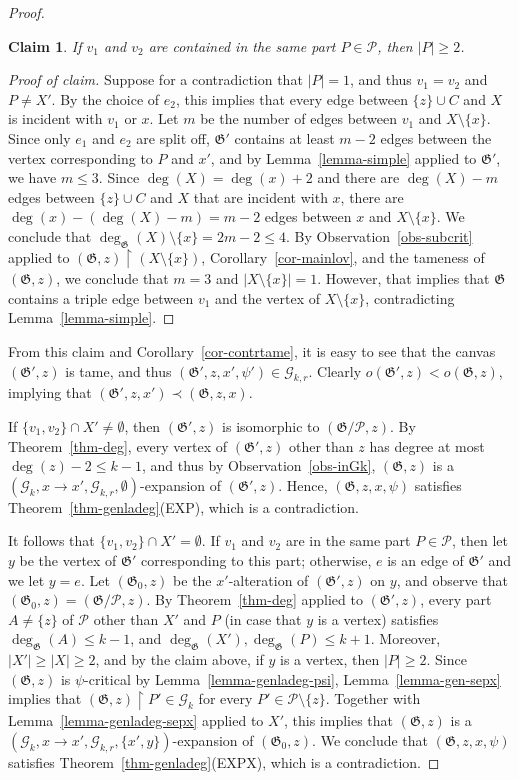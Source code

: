 \documentclass{article}
\newcommand{\PP}{\mathcal{P}}
\newcommand{\GG}{\mathcal{G}}
\newcommand\g{\mathfrak{G}}
\newtheorem*{claim*}{Claim}
\newenvironment{subproof}{%
  \renewcommand{\qedsymbol}{$\blacksquare$}%
  \begin{proof}[Proof of claim]%
}{%
  \end{proof}%
}
\begin{document}
\begin{proof}
\begin{claim*}
If $v_1$ and $v_2$ are contained in the same part $P\in \PP$, then $|P|\ge 2$.  
\end{claim*}
\begin{subproof}
Suppose for a contradiction that $|P|=1$, and thus $v_1=v_2$ and $P\neq X'$.
By the choice of $e_2$, this implies that every edge between $\{z\}\cup C$ and $X$ is incident with $v_1$ or $x$.
Let $m$ be the number of edges between $v_1$ and $X\setminus \{x\}$.
Since only $e_1$ and $e_2$ are split off, $\g'$ contains at least $m-2$ edges between the vertex corresponding to $P$ and $x'$, and by Lemma~\ref{lemma-simple} applied to $\g'$,
we have $m\le 3$.  Since $\deg(X)=\deg(x)+2$ and there are $\deg(X)-m$ edges between $\{z\}\cup C$ and $X$ that are incident with $x$,
there are $\deg(x)-(\deg(X)-m)=m-2$ edges between $x$ and $X\setminus\{x\}$.   We conclude that
$\deg_{\g}(X)\setminus\{x\} = 2m-2\le 4$.  By Observation~\ref{obs-subcrit} applied to $(\g,z)\restriction (X\setminus\{x\})$,
Corollary~\ref{cor-mainlov}, and the tameness of $(\g,z)$, we conclude that $m=3$ and $|X\setminus \{x\}|=1$.
However, that implies that $\g$ contains a triple edge between $v_1$ and the vertex of $X\setminus\{x\}$,
contradicting Lemma~\ref{lemma-simple}.
\end{subproof}

From this claim and Corollary~\ref{cor-contrtame}, it is easy to see that the canvas $(\g',z)$ is tame,
and thus $(\g',z,x',\psi')\in \GG_{k,r}$.  Clearly $o(\g',z)<o(\g,z)$, implying that $(\g',z,x')\prec (\g,z,x)$.

If $\{v_1,v_2\}\cap X'\neq\emptyset$, then $(\g',z)$ is isomorphic to $(\g / \PP,z)$.
By Theorem~\ref{thm-deg}, every vertex of $(\g',z)$ other than $z$ has degree at most $\deg(z)-2\le k-1$,
and thus by Observation~\ref{obs-inGk}, $(\g,z)$ is a $(\GG_k,x\to x',\GG_{k,r},\emptyset)$-expansion of $(\g',z)$.
Hence, $(\g,z,x,\psi)$ satisfies Theorem~\ref{thm-genladeg}(EXP), which is a contradiction.

It follows that $\{v_1,v_2\}\cap X'=\emptyset$.  If $v_1$ and $v_2$ are in the same part $P\in \PP$,
then let $y$ be the vertex of $\g'$ corresponding to this part; otherwise, $e$ is an edge of $\g'$ and we let $y=e$.
Let $(\g_0,z)$ be the $x'$-alteration of $(\g',z)$ on $y$, and observe that $(\g_0,z)=(\g / \PP,z)$.
By Theorem~\ref{thm-deg} applied to $(\g',z)$, every part $A\neq\{z\}$ of $\PP$ other than $X'$ and $P$ (in case that $y$ is a vertex) satisfies $\deg_{\g}(A)\le k-1$,
and $\deg_{\g}(X'),\deg_{\g}(P)\le k+1$.  Moreover, $|X'|\ge |X|\ge 2$, and by the claim above, if $y$ is a vertex, then $|P|\ge 2$.
Since $(\g,z)$ is $\psi$-critical by Lemma~\ref{lemma-genladeg-psi}, Lemma~\ref{lemma-gen-sepx}
implies that $(\g,z)\restriction P'\in \GG_k$ for every $P'\in \PP\setminus \{z\}$.  Together with Lemma~\ref{lemma-genladeg-sepx} applied to $X'$, this implies that
$(\g,z)$ is a $(\GG_k,x\to x',\GG_{k,r},\{x',y\})$-expansion of $(\g_0,z)$.
We conclude that $(\g,z,x,\psi)$ satisfies Theorem~\ref{thm-genladeg}(EXPX), which is a contradiction.
\end{proof}
\end{document}
